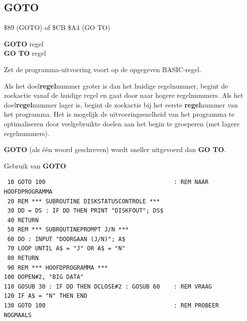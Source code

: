 
\newpage
\subsection{GOTO}
\begin{description}[leftmargin=2cm,style=nextline]
\item [Token:]    \$89 (GOTO) of \$CB \$A4 (GO TO)

\item [Formaat:]   {\bf GOTO} regel \\                 {\bf GO TO} regel

\item [Gebruik:]    Zet de programma-uitvoering voort op de opgegeven BASIC-regel.

\item [Opmerkingen:]  Als het doel{\bf regel}nummer groter is dan het huidige regelnummer, begint de zoekactie vanaf de huidige regel en gaat door naar hogere regelnummers. Als het doel{\bf regel}nummer lager is, begint de zoekactie bij het eerste {\bf regel}nummer van het programma. Het is mogelijk de uitvoeringssnelheid van het programma te optimaliseren door veelgebruikte doelen aan het begin te groeperen (met lagere regelnummers).

                  {\bf GOTO} (als één woord geschreven) wordt sneller uitgevoerd dan {\bf GO TO}.

\item [Voorbeeld:]  Gebruik van {\bf GOTO}

\begin{tcolorbox}[colback=black,coltext=white]
\verbatimfont{\codefont}
\begin{verbatim}
 10 GOTO 100                                     : REM NAAR HOOFDPROGRAMMA
 20 REM *** SUBROUTINE DISKSTATUSCONTROLE ***
 30 DD = DS : IF DD THEN PRINT "DISKFOUT"; DS$
 40 RETURN
 50 REM *** SUBROUTINEPROMPT J/N ***
 60 DO : INPUT "DOORGAAN (J/N)"; A$
 70 LOOP UNTIL A$ = "J" OR A$ = "N"
 80 RETURN
 90 REM *** HOOFDPROGRAMMA ***
100 DOPEN#2, "BIG DATA"
110 GOSUB 30 : IF DD THEN DCLOSE#2 : GOSUB 60    : REM VRAAG
120 IF A$ = "N" THEN END
130 GOTO 100                                     : REM PROBEER NOGMAALS
\end{verbatim}
\end{tcolorbox}
\end{description}


